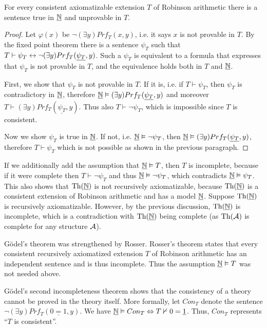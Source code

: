 \begin{theorem}
For every consistent axiomatizable extension $T$ of Robinson arithmetic there is a sentence true in $\underline{\mathbb{N}}$ and unprovable in $T$.
\end{theorem}
\begin{proof}
Let $\varphi(x)$ be $\neg (\exists y)Prf_T(x, y)$, i.e. it says $x$ is not provable in $T$. By the fixed point theorem there is a sentence $\psi_T$ such that $T \vdash \psi_T \leftrightarrow \neg (\exists y)Prf_T(\underline{\psi_T}, y)$. Such a $\psi_T$ is equivalent to a formula that expresses that $\psi_T$ is not provable in $T$, and the equivalence holds both in $T$ and $\underline{\mathbb{N}}$. 

First, we show that $\psi_T$ is not provable in $T$. If it is, i.e. if $T \vdash \psi_T$, then $\psi_T$ is contradictory in $\underline{\mathbb{N}}$, therefore $\underline{\mathbb{N}} \vDash (\exists y)Prf_T(\underline{\psi_T}, y)$ and moreover $T \vdash (\exists y)Prf_T(\underline{\psi_T}, y)$. Thus also $T \vdash \neg \psi_T$, which is impossible since $T$ is consistent.

Now we show $\psi_T$ is true in $\underline{\mathbb{N}}$. If not, i.e. $\underline{\mathbb{N}} \vDash \neg \psi_T$, then $\underline{\mathbb{N}} \vDash (\exists y)Prf_T(\underline{\psi_T}, y)$, therefore $T \vdash \psi_T$ which is not possible as shown in the previous paragraph.
\end{proof}

If we additionally add the assumption that $\underline{\mathbb{N}} \vDash T$, then $T$ is incomplete, because if it were complete then $T \vdash \neg \psi_T$ and thus $\underline{\mathbb{N}} \vDash \neg \psi_T$, which contradicts $\underline{\mathbb{N}} \vDash \psi_T$. This also shows that $\operatorname{Th}(\underline{\mathbb{N}})$ is not recursively axiomatizable, because $\operatorname{Th}(\underline{\mathbb{N}})$ is a consistent extension of Robinson arithmetic and has a model $\underline{\mathbb{N}}$. Suppose $\operatorname{Th}(\underline{\mathbb{N}})$ is recursively axiomatizable. However, by the previous discussion, $\operatorname{Th}(\underline{\mathbb{N}})$ is incomplete, which is a contradiction with $\operatorname{Th}(\underline{\mathbb{N}})$ being complete (as $\operatorname{Th}(\mathcal{A})$ is complete for any structure $\mathcal{A}$).

Gödel's theorem was strengthened by Rosser. Rosser's theorem states that every consistent recursively axiomatized extension $T$ of Robinson arithmetic has an independent sentence and is thus incomplete. Thus the assumption $\underline{\mathbb{N}} \vDash T$ was not needed above.

Gödel's second incompleteness theorem shows that the consistency of a theory cannot be proved in the theory itself. More formally, let $Con_T$ denote the sentence $\neg (\exists y)Prf_T(\underline{0 = 1}, y)$. We have $\underline{\mathbb{N}} \vDash Con_T \Leftrightarrow T \nvdash 0 = \underline{1}$. Thus, $Con_T$ represents ``$T$ is consistent''.

